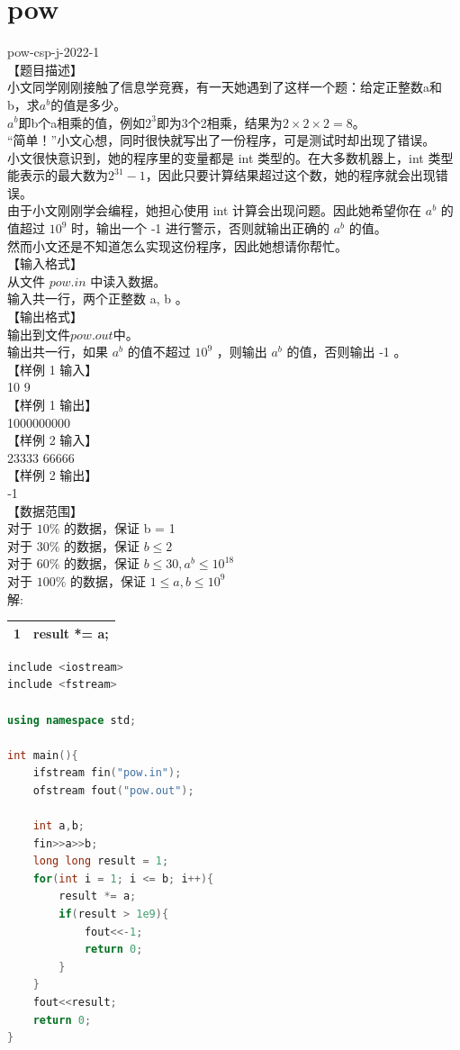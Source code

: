 \documentclass[12pt,twiside,a4paper]{ctexbook}
\numberwithin{chapter}{part}
\begin{document}
\section{pow}
pow-csp-j-2022-1\\
【题目描述】\\
小文同学刚刚接触了信息学竞赛，有一天她遇到了这样一个题：给定正整数a和b，求$a^b$的值是多少。\\
$a^b$即b个a相乘的值，例如$2^3$即为3个2相乘，结果为$2\times2\times2=8$。\\
“简单！”小文心想，同时很快就写出了一份程序，可是测试时却出现了错误。\\
小文很快意识到，她的程序里的变量都是 int 类型的。在大多数机器上，int 类型
能表示的最大数为$2^{31}−1$，因此只要计算结果超过这个数，她的程序就会出现错误。\\
由于小文刚刚学会编程，她担心使用 int 计算会出现问题。因此她希望你在 $a^b$ 的
值超过 $10^9$ 时，输出一个 ‐1 进行警示，否则就输出正确的 $a^b$ 的值。\\
然而小文还是不知道怎么实现这份程序，因此她想请你帮忙。\\
【输入格式】\\
从文件 $pow.in$ 中读入数据。\\
输入共一行，两个正整数 a, b 。\\
【输出格式】\\
输出到文件$pow.out$中。\\
输出共一行，如果 $a^b$ 的值不超过 $10^9$ ，则输出 $a^b$ 的值，否则输出 ‐1 。\\
【样例 1 输入】\\
10 9\\
【样例 1 输出】\\
1000000000\\
【样例 2 输入】\\
23333 66666\\
【样例 2 输出】\\
‐1\\
【数据范围】\\
对于 $10\%$ 的数据，保证 b = 1\\
对于 $30\%$ 的数据，保证 $b \leq 2$\\
对于 $60\%$ 的数据，保证 $b \leq 30, a^b \leq 10^{18}$\\
对于 $100\%$ 的数据，保证 $1 \leq a, b \leq 10^9$\\
解:\\
\begin{tabular}{|c|c|}
\hline
1 & result *= a;\\
\hline
\end{tabular}
\begin{lstlisting}[language=C++]
include <iostream>
include <fstream>

using namespace std;

int main(){
	ifstream fin("pow.in");
	ofstream fout("pow.out");

	int a,b;
	fin>>a>>b;
	long long result = 1;
	for(int i = 1; i <= b; i++){
		result *= a;
		if(result > 1e9){
			fout<<-1;
			return 0;
		}
	}
	fout<<result;
	return 0;
}
\end{lstlisting}
\end{document}

